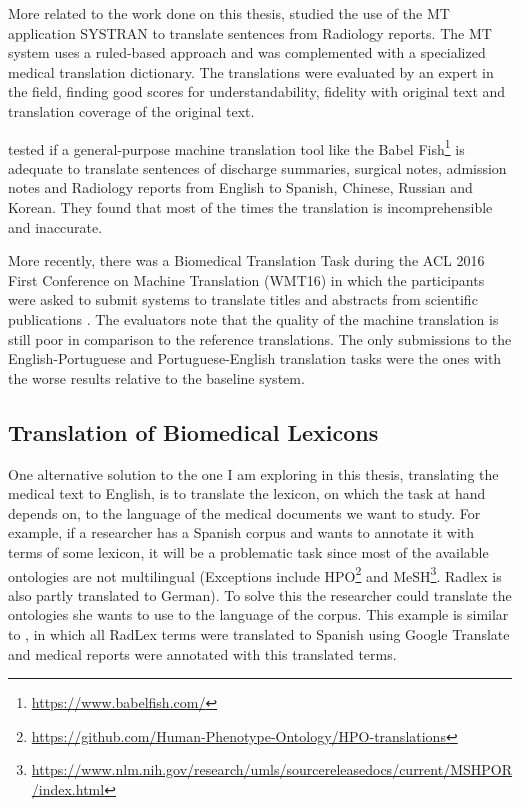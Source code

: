 More related to the work done on this thesis, \citep{Castilla2007a} studied the use of the MT application SYSTRAN to translate sentences from Radiology reports. The MT system uses a ruled-based approach and was complemented with a specialized medical translation dictionary. The translations were evaluated by an expert in the field, finding good scores for understandability, fidelity with original text and translation coverage of the original text.

\citep{Zeng-Treitler2010} tested if a general-purpose machine translation tool like the Babel Fish\footnote{\url{https://www.babelfish.com/}} is adequate to translate sentences of discharge summaries, surgical notes, admission notes and Radiology reports from English to Spanish, Chinese, Russian and Korean. They found that most of the times the translation is incomprehensible and inaccurate.

More recently, there was a Biomedical Translation Task during the ACL 2016 First Conference on Machine Translation (WMT16) in which the participants were asked to submit systems to translate titles and abstracts from scientific publications \citep{Bojar2016}. The evaluators note that the quality of the machine translation is still poor in comparison to the reference translations. The only submissions to the English-Portuguese and Portuguese-English translation tasks \citep{Aires2016} were the ones with the worse results relative to the baseline system.

\subsection{Translation of Biomedical Lexicons}

One alternative solution to the one I am exploring in this thesis, translating the medical text to English, is to translate the lexicon, on which the task at hand depends on, to the language of the medical documents we want to study. For example, if a researcher has a Spanish corpus and wants to annotate it with terms of some lexicon, it will be a problematic task since most of the available ontologies are not multilingual (Exceptions include HPO\footnote{\url{https://github.com/Human-Phenotype-Ontology/HPO-translations}} \citep{Kohler2016} and MeSH\footnote{\url{https://www.nlm.nih.gov/research/umls/sourcereleasedocs/current/MSHPOR/index.html}}. Radlex is also partly translated to German). To solve this the researcher could translate the ontologies she wants to use to the language of the corpus. This example is similar to \citep{Cotik2015}, in which all RadLex terms were translated to Spanish using Google Translate and medical reports were annotated with this translated terms. 

